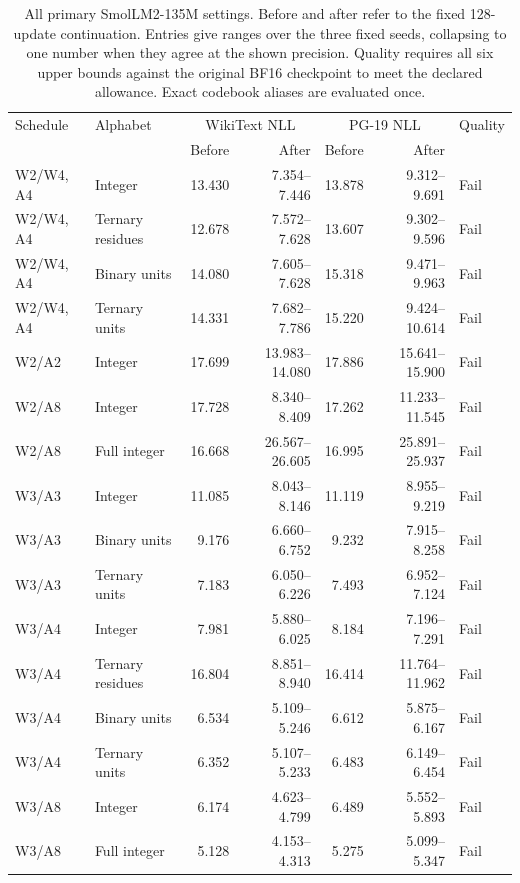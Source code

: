 \documentclass[11pt]{article}
\begin{document}
\begin{table}[p]
\centering\scriptsize
\setlength{\tabcolsep}{3.5pt}
\caption{All primary SmolLM2-135M settings. Before and after refer to the fixed 128-update continuation. Entries give ranges over the three fixed seeds, collapsing to one number when they agree at the shown precision. Quality requires all six upper bounds against the original BF16 checkpoint to meet the declared allowance. Exact codebook aliases are evaluated once.}
\label{tab:low-precision-primary}
\begin{tabular}{llrrrrl}
\toprule
Schedule & Alphabet & \multicolumn{2}{c}{WikiText NLL} & \multicolumn{2}{c}{PG-19 NLL} & Quality\\
& & Before & After & Before & After & \\
\midrule
W2/W4, A4 & Integer & 13.430 & 7.354--7.446 & 13.878 & 9.312--9.691 & Fail \\
W2/W4, A4 & Ternary residues & 12.678 & 7.572--7.628 & 13.607 & 9.302--9.596 & Fail \\
W2/W4, A4 & Binary units & 14.080 & 7.605--7.628 & 15.318 & 9.471--9.963 & Fail \\
W2/W4, A4 & Ternary units & 14.331 & 7.682--7.786 & 15.220 & 9.424--10.614 & Fail \\
W2/A2 & Integer & 17.699 & 13.983--14.080 & 17.886 & 15.641--15.900 & Fail \\
W2/A8 & Integer & 17.728 & 8.340--8.409 & 17.262 & 11.233--11.545 & Fail \\
W2/A8 & Full integer & 16.668 & 26.567--26.605 & 16.995 & 25.891--25.937 & Fail \\
W3/A3 & Integer & 11.085 & 8.043--8.146 & 11.119 & 8.955--9.219 & Fail \\
W3/A3 & Binary units & 9.176 & 6.660--6.752 & 9.232 & 7.915--8.258 & Fail \\
W3/A3 & Ternary units & 7.183 & 6.050--6.226 & 7.493 & 6.952--7.124 & Fail \\
W3/A4 & Integer & 7.981 & 5.880--6.025 & 8.184 & 7.196--7.291 & Fail \\
W3/A4 & Ternary residues & 16.804 & 8.851--8.940 & 16.414 & 11.764--11.962 & Fail \\
W3/A4 & Binary units & 6.534 & 5.109--5.246 & 6.612 & 5.875--6.167 & Fail \\
W3/A4 & Ternary units & 6.352 & 5.107--5.233 & 6.483 & 6.149--6.454 & Fail \\
W3/A8 & Integer & 6.174 & 4.623--4.799 & 6.489 & 5.552--5.893 & Fail \\
W3/A8 & Full integer & 5.128 & 4.153--4.313 & 5.275 & 5.099--5.347 & Fail \\

\end{tabular}
\end{table}
\end{document}
